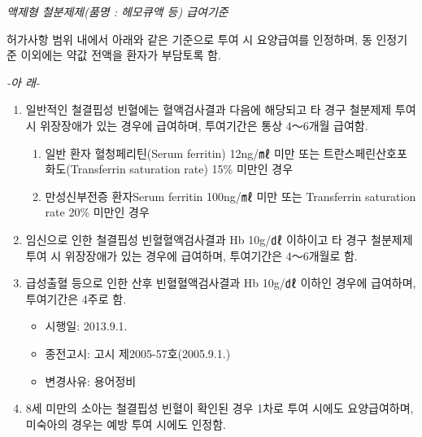 \begin{commentbox}{}
\emph{액제형 철분제제(품명 : 헤모큐액 등) 급여기준}\par
허가사항 범위 내에서 아래와 같은 기준으로 투여 시 요양급여를 인정하며, 동 인정기준 이외에는 약값 전액을 환자가 부담토록 함.\\
\begin{center}\emph{-아 래-}\end{center}
\begin{enumerate}[가.]\tightlist
\item 일반적인 철결핍성 빈혈에는 혈액검사결과 다음에 해당되고 타 경구 철분제제 투여 시 위장장애가 있는 경우에 급여하며, 투여기간은 통상 4～6개월 급여함.
	\begin{enumerate}[1)]\tightlist
	\item 일반 환자 혈청페리틴(Serum ferritin) 12ng/㎖ 미만 또는 트란스페린산호포화도(Transferrin saturation rate) 15\% 미만인 경우 
	\item 만성신부전증 환자Serum ferritin 100ng/㎖ 미만 또는 Transferrin saturation rate 20\% 미만인 경우 
	\end{enumerate}
\item 임신으로 인한 철결핍성 빈혈혈액검사결과 Hb 10g/㎗ 이하이고 타 경구 철분제제 투여 시 위장장애가 있는 경우에 급여하며, 투여기간은 4～6개월로 함. 
\item 급성출혈 등으로 인한 산후 빈혈혈액검사결과 Hb 10g/㎗ 이하인 경우에 급여하며, 투여기간은 4주로 함.    
	\begin{itemize}[*]\tightlist
	\item 시행일: 2013.9.1.
	\item 종전고시: 고시 제2005-57호(2005.9.1.)
	\item 변경사유: 용어정비
	\end{itemize}
\item 8세 미만의 소아는 철결핍성 빈혈이 확인된 경우 1차로 투여 시에도 요양급여하며, 미숙아의 경우는 예방 투여 시에도 인정함.
\end{enumerate}
\end{commentbox}

